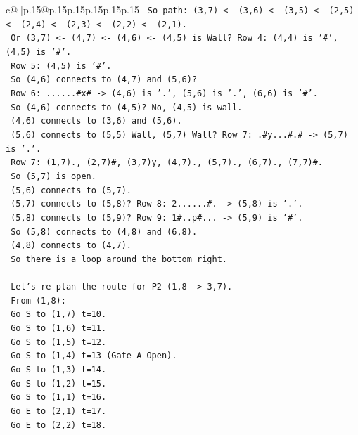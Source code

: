 \documentclass{article}
\begin{document}
{\begin{supertabular}{c@{$\;$}|p{.15\linewidth}@{}p{.15\linewidth}p{.15\linewidth}p{.15\linewidth}p{.15\linewidth}p{.15\linewidth}}
{{{\texttt{    So path: (3,7) <{-} (3,6) <{-} (3,5) <{-} (2,5) <{-} (2,4) <{-} (2,3) <{-} (2,2) <{-} (2,1).} \\
\texttt{    Or (3,7) <{-} (4,7) <{-} (4,6) <{-} (4,5) is Wall? Row 4: (4,4) is '\#', (4,5) is '\#'.} \\
\texttt{    Row 5: (4,5) is '\#'.} \\
\texttt{    So (4,6) connects to (4,7) and (5,6)?} \\
\texttt{    Row 6: ......\#x\# {-}> (4,6) is '.', (5,6) is '.', (6,6) is '\#'.} \\
\texttt{    So (4,6) connects to (4,5)? No, (4,5) is wall.} \\
\texttt{    (4,6) connects to (3,6) and (5,6).} \\
\texttt{    (5,6) connects to (5,5) Wall, (5,7) Wall? Row 7: .\#y...\#.\# {-}> (5,7) is '.'.} \\
\texttt{    Row 7: (1,7)., (2,7)\#, (3,7)y, (4,7)., (5,7)., (6,7)., (7,7)\#.} \\
\texttt{    So (5,7) is open.} \\
\texttt{    (5,6) connects to (5,7).} \\
\texttt{    (5,7) connects to (5,8)? Row 8: 2......\#. {-}> (5,8) is '.'.} \\
\texttt{    (5,8) connects to (5,9)? Row 9: 1\#..p\#... {-}> (5,9) is '\#'.} \\
\texttt{    So (5,8) connects to (4,8) and (6,8).} \\
\texttt{    (4,8) connects to (4,7).} \\
\texttt{    So there is a loop around the bottom right.} \\
\\ 
\texttt{    Let's re{-}plan the route for P2 (1,8 {-}> 3,7).} \\
\texttt{    From (1,8):} \\
\texttt{    Go S to (1,7) t=10.} \\
\texttt{    Go S to (1,6) t=11.} \\
\texttt{    Go S to (1,5) t=12.} \\
\texttt{    Go S to (1,4) t=13 (Gate A Open).} \\
\texttt{    Go S to (1,3) t=14.} \\
\texttt{    Go S to (1,2) t=15.} \\
\texttt{    Go S to (1,1) t=16.} \\
\texttt{    Go E to (2,1) t=17.} \\
\texttt{    Go E to (2,2) t=18.} \\
}}}
\end{supertabular}}
\end{document}
